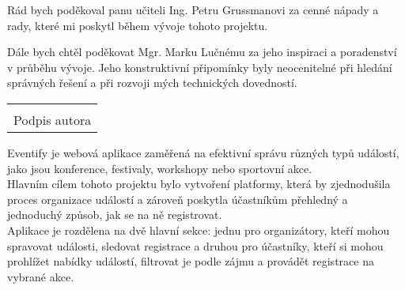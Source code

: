 \documentclass[12pt, a4paper,
twoside,        %
openright
]{report}
\newcommand\datumOdevzdani{1. 1. 2025} %
\begin{document}
	\noindent Rád bych poděkoval panu učiteli Ing. Petru Grussmanovi za cenné nápady a rady, které mi poskytl během vývoje tohoto projektu.
	
	Dále bych chtěl poděkovat Mgr. Marku Lučnému za jeho inspiraci a poradenství v průběhu vývoje. Jeho konstruktivní připomínky byly neocenitelné při hledání správných řešení a při rozvoji mých technických dovedností.
	
	\vspace*{0.5\textheight} %

	\vfill
	\noindent{V Opavě \datumOdevzdani\\}
	\noindent
	\begin{minipage}{\linewidth}
		\hspace{9.5cm} 
		\begin{tabular}{@{}p{6cm}@{}}
			\dotfill \\
			Podpis autora
		\end{tabular}
	\end{minipage}
	
	\cleardoublepage %


	\noindent Eventify je webová aplikace zaměřená na efektivní správu různých typů událostí, jako jsou konference, festivaly, workshopy nebo sportovní akce. \\
	Hlavním cílem tohoto projektu bylo vytvoření platformy, která by zjednodušila proces organizace událostí a zároveň poskytla účastníkům přehledný a jednoduchý způsob, jak se na ně registrovat. \\
	Aplikace je rozdělena na dvě hlavní sekce: jednu pro organizátory, kteří mohou spravovat události, sledovat registrace a druhou pro účastníky, kteří si mohou prohlížet nabídky událostí, filtrovat je podle zájmu a provádět registrace na vybrané akce.
	
\end{document}

